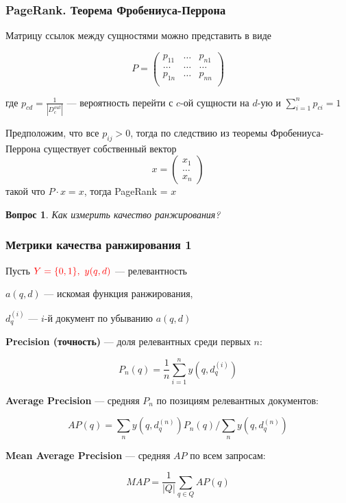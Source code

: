 \documentclass[fullscreen=true, bookmarks=true, hyperref={pdfencoding=unicode}]{beamer}
\newtheorem*{question}{Вопрос}
\begin{document}
\begin{frame}
  \frametitle{PageRank. Теорема Фробениуса-Перрона}

  Матрицу ссылок между сущностями можно представить в виде

  $$ P = \left( \begin{array}{ccc}
  p_{11} & \dots & p_{n1} \\
  \dots & \dots & \dots \\
  p_{1n} & \dots & p_{nn} \\
  \end{array} \right)$$

  где $p_{cd} = \frac{1}{|D_c^{out}|}$ — вероятность перейти с $c$-ой сущности на $d$-ую и $\sum\limits_{i=1}^n p_{ci} = 1$

  Предположим, что все $p_{ij} > 0$, тогда по следствию из теоремы Фробениуса-Перрона существует собственный вектор
  $$ x = \left( \begin{array}{c}
  x_{1} \\
  \dots \\
  x_{n}
  \end{array} \right)$$
  такой что $P \cdot x = x$, тогда PageRank = $x$
\end{frame}


\begin{frame}
  \begin{question}
    Как измерить качество ранжирования?
  \end{question}
\end{frame}


\begin{frame}
   \frametitle{Метрики качества ранжирования 1}

     Пусть $\color{red}{Y = \{0,1\}},\ y(q, d)$ — релевантность

     $a(q, d)$ — искомая функция ранжирования,

     $d_q^{(i)}$ — $i$-й документ по убыванию $a(q, d)$

     {\bf Precision (точность)} — доля релевантных среди первых $n$:

     $$ P_n(q) = \frac{1}{n} \sum\limits_{i=1}^{n} y\left(q, d_q^{(i)}\right) $$

     {\bf Average Precision} — средняя $P_n$ по позициям релевантных документов:

     $$ AP(q) =  \sum\limits_n y\left(q, d_q^{(n)}\right) P_n(q) \big/ \sum\limits_n y\left(q, d_q^{(n)}\right) $$

     {\bf Mean Average Precision} — средняя $AP$ по всем запросам:

     $$ MAP = \frac{1}{|Q|} \sum\limits_{q \in Q} AP(q) $$
\end{frame}
\end{document}
